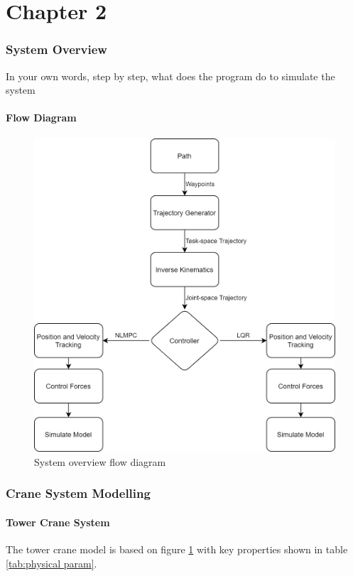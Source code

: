 \documentclass{UoNMCHA}
\numberwithin{equation}{section}
\begin{document}
	\part*{Chapter 2}
	\section{System Overview}
	In your own words, step by step, what does the program do to simulate the system
	
	\subsection{Flow Diagram}
	
	\begin{figure}[H]
		\begin{center}
			\includegraphics[width=.8\linewidth]{figs/Picture4}
			\caption{System overview flow diagram}
			\label{figs/Picture4}
		\end{center}
	\end{figure}
	
	\newpage
	\section{Crane System Modelling}
	
	\subsection{Tower Crane System}
	The tower crane model is based on figure \ref{figs/Picture4} with key properties shown in table \ref{tab:physical param}.
	
\end{document}
